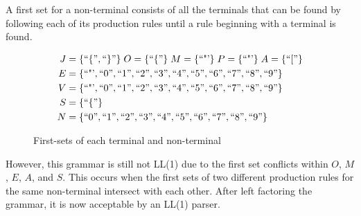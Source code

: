 \begin{definition}
    A first set for a non-terminal consists of all the terminals that can be found by following each of its production rules until a rule beginning with a terminal is found.
\end{definition}

\begin{figure}[H]
    \begin{center}
        \begin{equation}
            \begin{split}
                J &= \{``\{", ``\}"\}\;
                O = \{ ``\{" \}\;
                M = \{ \text{``"'} \}\;
                P = \{ \text{``"'} \}\;
                A = \{ ``[" \}\\
                E &= \{ \text{``"'}, ``0", ``1", ``2", ``3", ``4", ``5", ``6", ``7", ``8", ``9" \}\\
                V &= \{ \text{``"'}, ``0", ``1", ``2", ``3", ``4", ``5", ``6", ``7", ``8", ``9" \}\\
                S &= \{ ``\{" \}\\
                N &= \{``0", ``1", ``2", ``3", ``4", ``5", ``6", ``7", ``8", ``9" \}
            \end{split}
            \nonumber
        \end{equation}
    \end{center}
    \caption{\label{fig:3.8}First-sets of each terminal and non-terminal}
\end{figure}

However, this grammar is still not LL(1) due to the first set conflicts within $O$, $M$, $E$, $A$, and $S$. This occurs when the first sets of two different production rules for the same non-terminal intersect with each other. After left factoring the grammar, it is now acceptable by an LL(1) parser.

